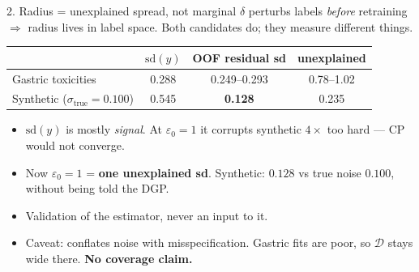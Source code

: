 \documentclass{beamer}
\begin{document}
\begin{frame}{2. Radius = unexplained spread, not marginal}
  \small
  $\delta$ perturbs labels \emph{before} retraining $\Rightarrow$ radius lives in
  label space. Both candidates do; they measure different things.
  \begin{center}\small
  \begin{tabular}{@{}lccc@{}}
    \toprule
    & $\mathrm{sd}(y)$ & OOF residual sd & unexplained \\
    \midrule
    Gastric toxicities & 0.288 & 0.249--0.293 & 0.78--1.02 \\
    Synthetic ($\sigma_{\text{true}}=0.100$) & 0.545 & \textbf{0.128} & 0.235 \\
    \bottomrule
  \end{tabular}
  \end{center}
  \medskip
  \begin{itemize}
    \item $\mathrm{sd}(y)$ is mostly \emph{signal}. At $\varepsilon_0=1$ it corrupts
      synthetic $4\times$ too hard --- CP would not converge.
    \item Now $\varepsilon_0=1$ = \textbf{one unexplained sd}. Synthetic: $0.128$ vs
      true noise $0.100$, without being told the DGP.
    \item Validation of the estimator, never an input to it.
    \item Caveat: conflates noise with misspecification. Gastric fits are poor, so
      $\mathcal D$ stays wide there. \textbf{No coverage claim.}
  \end{itemize}
\end{frame}
\end{document}
